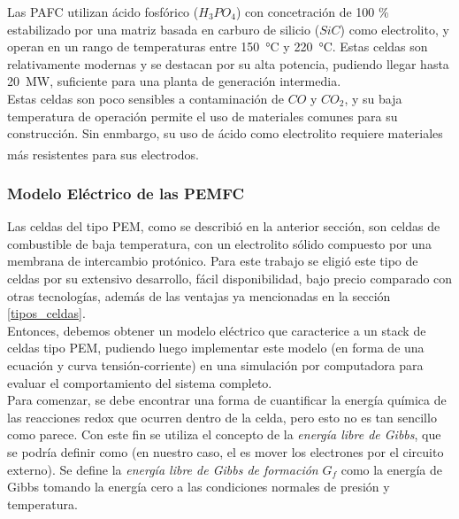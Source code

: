 Las PAFC utilizan ácido fosfórico ($H_3PO_4$) con concetración de 100 \% estabilizado por una matriz basada en carburo de silicio ($SiC$) como electrolito, y operan en un rango de temperaturas entre \SI{150}{\celsius} y \SI{220}{\celsius}. Estas celdas son relativamente modernas y se destacan por su alta potencia, pudiendo llegar hasta \SI{20}{\mega\watt}, suficiente para una planta de generación intermedia.\\

Estas celdas son poco sensibles a contaminación de $CO$ y $CO_2$, y su baja temperatura de operación permite el uso de materiales comunes para su construcción. Sin enmbargo, su uso de ácido como electrolito requiere materiales más resistentes para sus electrodos.\textsuperscript{\cite{FC-FundAndAppl}\cite{FCHandbook}}\\

\subsubsection{Modelo Eléctrico de las PEMFC}

Las celdas del tipo PEM, como se describió en la anterior sección, son celdas de combustible de baja temperatura, con un electrolito sólido compuesto por una membrana de intercambio protónico. Para este trabajo se eligió este tipo de celdas por su extensivo desarrollo, fácil disponibilidad, bajo precio comparado con otras tecnologías, además de las ventajas ya mencionadas en la sección \ref{tipos_celdas}.\\

Entonces, debemos obtener un modelo eléctrico que caracterice a un stack de celdas tipo PEM, pudiendo luego implementar este modelo (en forma de una ecuación y curva tensión-corriente) en una simulación por computadora para evaluar el comportamiento del sistema completo.\\

Para comenzar, se debe encontrar una forma de cuantificar la energía química de las reacciones redox que ocurren dentro de la celda, pero esto no es tan sencillo como parece. Con este fin se utiliza el concepto de la \textit{energía libre de Gibbs}, que se podría definir como  (en nuestro caso, el  es mover los electrones por el circuito externo). Se define la \textit{energía libre de Gibbs de formación} $G_f$ como la energía de Gibbs tomando la energía cero a las condiciones normales de presión y temperatura.\\

